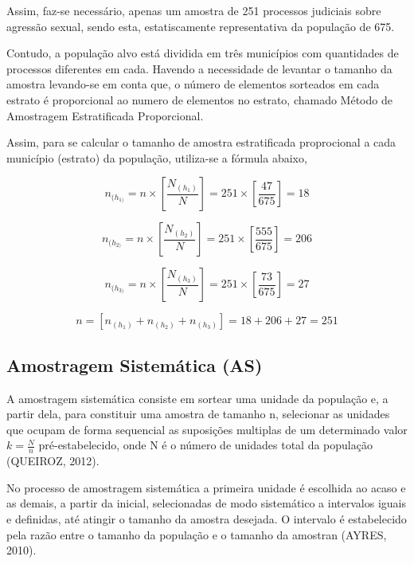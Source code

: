 Assim, faz-se necessário, apenas um amostra de 251 processos judiciais sobre
agressão sexual, sendo esta, estatiscamente representativa da população de 675.
\vskip0.3cm

Contudo, a população alvo está dividida em três municípios com quantidades
de processos diferentes em cada. Havendo a necessidade de levantar o tamanho da
amostra levando-se em conta que, o número de elementos sorteados em cada estrato
é proporcional ao numero de elementos no estrato, chamado Método de Amostragem
Estratificada Proporcional.
\vskip0.3cm

Assim, para se calcular o tamanho de amostra estratificada proprocional a cada
município (estrato) da população, utiliza-se a fórmula abaixo,


\newpage



$$
n_{(h_{1)}}= n \times  \left[\frac{N_{(h_{1})}}{N} \right]= 251 \times \left[\frac{47}{675}\right]= 18
$$

$$ 	n_{(h_{2)}}= n \times \left[\frac{N_{(h_{2})}}{N} \right]=251 \times \left[\frac{555}{675}\right]= 206 $$

$$ 	n_{(h_{3)}}= n \times \left[\frac{N_{(h_{3})}}{N} \right]= 251 \times \left[\frac{73}{675}\right]= 27 $$

$$ n = \left[ n_{(h_{1})} + n_{(h_{2})} + n_{(h_{3})}\right]= 18+206+27 = 251
$$




\subsection{Amostragem Sistemática (AS)}


A amostragem sistemática consiste em sortear uma unidade da população e, a partir dela, para constituir
uma amostra de tamanho n, selecionar as unidades que ocupam de forma sequencial as suposições multiplas
de um determinado valor $k=\frac{N}{n}$ pré-estabelecido, onde N é o número de unidades total da população (QUEIROZ, 2012).\vskip0.3cm

No processo de amostragem sistemática a primeira unidade é escolhida ao acaso e as demais, a partir da inicial, selecionadas de modo sistemático a intervalos iguais e definidas, até atingir o tamanho da amostra desejada. O intervalo é estabelecido pela razão entre o tamanho da população e o tamanho da amostran (AYRES, 2010).\vskip0.3cm


